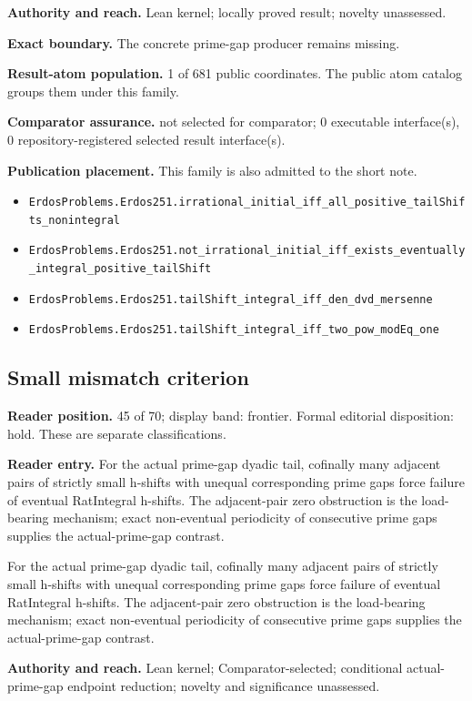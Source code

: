 \documentclass[11pt]{article}
\begin{document}
\textbf{Authority and reach.} Lean kernel; locally proved result; novelty unassessed.

\textbf{Exact boundary.} The concrete prime-gap producer remains missing.

\textbf{Result-atom population.} 1 of 681 public coordinates. The public atom catalog groups them under this family.

\textbf{Comparator assurance.} not selected for comparator; 0 executable interface(s), 0 repository-registered selected result interface(s).

\textbf{Publication placement.} This family is also admitted to the short note.

\begin{itemize}
  \item \nolinkurl{ErdosProblems.Erdos251.irrational_initial_iff_all_positive_tailShifts_nonintegral}
  \item \nolinkurl{ErdosProblems.Erdos251.not_irrational_initial_iff_exists_eventually_integral_positive_tailShift}
  \item \nolinkurl{ErdosProblems.Erdos251.tailShift_integral_iff_den_dvd_mersenne}
  \item \nolinkurl{ErdosProblems.Erdos251.tailShift_integral_iff_two_pow_modEq_one}
\end{itemize}

\subsection{Small mismatch criterion}
\textbf{Reader position.} 45 of 70; display band: frontier.  Formal editorial disposition: hold.  These are separate classifications.

\textbf{Reader entry.} For the actual prime-gap dyadic tail, cofinally many adjacent pairs of strictly small h-shifts with unequal corresponding prime gaps force failure of eventual RatIntegral h-shifts. The adjacent-pair zero obstruction is the load-bearing mechanism; exact non-eventual periodicity of consecutive prime gaps supplies the actual-prime-gap contrast.

For the actual prime-gap dyadic tail, cofinally many adjacent pairs of strictly small h-shifts with unequal corresponding prime gaps force failure of eventual RatIntegral h-shifts. The adjacent-pair zero obstruction is the load-bearing mechanism; exact non-eventual periodicity of consecutive prime gaps supplies the actual-prime-gap contrast.

\textbf{Authority and reach.} Lean kernel; Comparator-selected; conditional actual-prime-gap endpoint reduction; novelty and significance unassessed.
\end{document}
